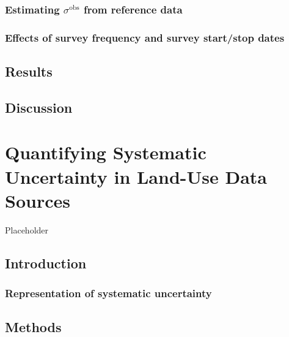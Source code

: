 \documentclass[
]{book}
\begin{document}
\hypertarget{estimating-sigmamathrmobs-from-reference-data}{%
\subsection{\texorpdfstring{Estimating \(\sigma^\mathrm{obs}\) from reference data}{Estimating \textbackslash sigma\^{}\textbackslash mathrm\{obs\} from reference data}}\label{estimating-sigmamathrmobs-from-reference-data}}

\hypertarget{effects-of-survey-frequency-and-survey-startstop-dates}{%
\subsection{Effects of survey frequency and survey start/stop dates}\label{effects-of-survey-frequency-and-survey-startstop-dates}}

\hypertarget{results}{%
\section{Results}\label{results}}

\hypertarget{discussion}{%
\section{Discussion}\label{discussion}}

\hypertarget{quantifying-systematic-uncertainty-in-land-use-data-sources}{%
\chapter{Quantifying Systematic Uncertainty in Land-Use Data Sources}\label{quantifying-systematic-uncertainty-in-land-use-data-sources}}

Placeholder

\hypertarget{introduction-2}{%
\section{Introduction}\label{introduction-2}}

\hypertarget{representation-of-systematic-uncertainty}{%
\subsection{Representation of systematic uncertainty}\label{representation-of-systematic-uncertainty}}

\hypertarget{methods-1}{%
\section{Methods}\label{methods-1}}
\end{document}
